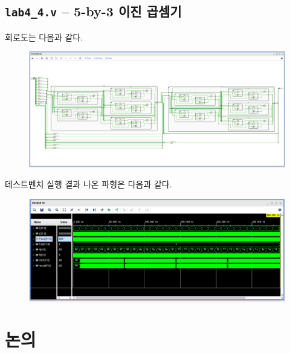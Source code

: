 \documentclass{scrartcl}
\begin{document}
\subsection{\texttt{lab4\_4.v} -- 5-by-3 이진 곱셈기}
회로도는 다음과 같다.
\begin{figure}[H]
  \centering
  \includegraphics[width=0.9\linewidth]{lab4_4_schematic.png}
\end{figure}
테스트벤치 실행 결과 나온 파형은 다음과 같다.
\begin{figure}[H]
  \centering
  \includegraphics[width=0.9\linewidth]{lab4_4_waveform.png}
\end{figure}

\section{논의}
\end{document}
